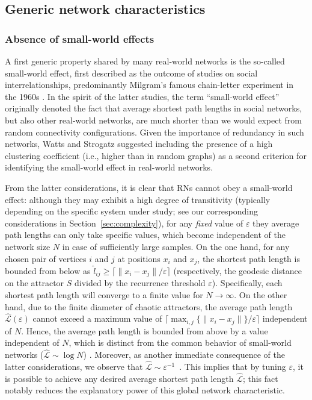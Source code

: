 \documentclass[graybox]{svmult}
\begin{document}
\subsection{Generic network characteristics}

\subsubsection{Absence of small-world effects}

A first generic property shared by many real-world networks is the so-called small-world effect, first described as the outcome of studies on social interrelationships, predominantly Milgram's famous chain-letter experiment in the 1960s \cite{Milgram1967}. In the spirit of the latter studies, the term ``small-world effect'' originally denoted the fact that average shortest path lengths in social networks, but also other real-world networks, are much shorter than we would expect from random connectivity configurations. Given the importance of redundancy in such networks, Watts and Strogatz \cite{Watts1998} suggested including the presence of a high clustering coefficient (i.e., higher than in random graphs) as a second criterion for identifying the small-world effect in real-world networks.

From the latter considerations, it is clear that RNs cannot obey a small-world effect: although they may exhibit a high degree of transitivity (typically depending on the specific system under study; see our corresponding considerations in Section~\ref{sec:complexity}), for any \emph{fixed} value of $\varepsilon$ they average path lengths can only take specific values, which become independent of the network size $N$ in case of sufficiently large samples. On the one hand, for any chosen pair of vertices $i$ and $j$ at positions $x_i$ and $x_j$, the shortest path length is bounded from below as $\hat{l}_{ij}\geq \lceil\|x_i-x_j\|/\varepsilon\rceil$ (respectively, the geodesic distance on the attractor $S$ divided by the recurrence threshold $\varepsilon$). Specifically, each shortest path length will converge to a finite value for $N\to\infty$. On the other hand, due to the finite diameter of chaotic attractors, the average path length $\hat{\mathcal{L}}(\varepsilon)$ cannot exceed a maximum value of $\lceil\max_{i,j}\{\|x_i-x_j\|\}/\varepsilon\rceil$ independent of $N$. Hence, the average path length is bounded from above by a value independent of $N$, which is distinct from the common behavior of small-world networks ($\hat{\mathcal{L}}\sim \log N$) \cite{Watts1998}. Moreover, as another immediate consequence of the latter considerations, we observe that $\hat{\mathcal{L}}\sim\varepsilon^{-1}$~\cite{Donner2010NJP}. This implies that by tuning $\varepsilon$, it is possible to achieve any desired average shortest path length $\hat{\mathcal{L}}$; this fact notably reduces the explanatory power of this global network characteristic.
\end{document}
